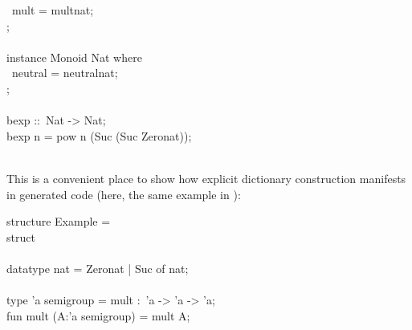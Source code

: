\begin{isabellebody}
\begin{isamarkuptext}
\hspace*{0pt} ~mult = mult{}nat;\\
\hspace*{0pt}{\char125};\\
\hspace*{0pt}\\
\hspace*{0pt}instance Monoid Nat where {}\\
\hspace*{0pt} ~neutral = neutral{}nat;\\
\hspace*{0pt}{\char125};\\
\hspace*{0pt}\\
\hspace*{0pt}bexp ::~Nat -> Nat;\\
\hspace*{0pt}bexp n = pow n (Suc (Suc Zero{}nat));\\
\hspace*{0pt}\\
\hspace*{0pt}{\char125}%
\end{isamarkuptext}%
\isamarkuptrue%
%
\endisatagquote
{\isafoldquote}%
%
\isadelimquote
%
\endisadelimquote
%
\begin{isamarkuptext}%
\noindent This is a convenient place to show how explicit dictionary construction
  manifests in generated code (here, the same example in ):%
\end{isamarkuptext}%
\isamarkuptrue%
%
\isadelimquote
%
\endisadelimquote
%
\isatagquote
%
\begin{isamarkuptext}%
\isatypewriter%
\noindent%
\hspace*{0pt}structure Example = \\
\hspace*{0pt}struct\\
\hspace*{0pt}\\
\hspace*{0pt}datatype nat = Zero{}nat | Suc of nat;\\
\hspace*{0pt}\\
\hspace*{0pt}type 'a semigroup = {}mult :~'a -> 'a -> 'a{};\\
\hspace*{0pt}fun mult (A{}:'a semigroup) = {}mult A{};\\

\end{isamarkuptext}
\end{isabellebody}
